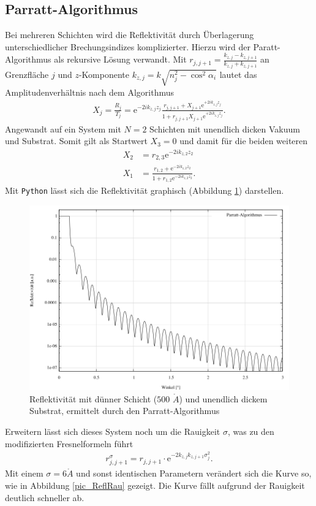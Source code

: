 \subsection{Parratt-Algorithmus}
Bei mehreren Schichten wird die Reflektivität durch Überlagerung unterschiedlicher Brechungsindizes komplizierter. Hierzu wird der Paratt-Algorithmus als
rekursive Lösung verwandt. Mit $r_{j,j+1} = \frac{k_{z,j}-k_{z,j+1}}{k_{z,j}+k_{z,j+1}}$ an Grenzfläche $j$ und $z$-Komponente $k_{z,j} = k\sqrt{n_j^2-\cos^2\alpha_i}$
lautet das Amplitudenverhältnis nach dem Algorithmus
\begin{align}
 X_j = \frac{R_j}{T_j} = \text{e}^{-2ik_{z,j}z_j}\frac{r_{j,j+1} + X_{j+1} \text{e}^{+2ik_{z,j}z_j}}{1 + r_{j,j+1} X_{j+1}\text{e}^{+2ik_{z,j}z_j}}.
\end{align}
Angewandt auf ein System mit $N=2$ Schichten mit unendlich dicken Vakuum und Substrat. Somit gilt als Startwert $X_3 = 0$ und damit für die beiden weiteren
\begin{align}
 X_2 &= r_{2,3}\text{e}^{-2ik_{z,2}z_2}\\
 X_1 &= \frac{r_{1,2}+\text{e}^{-2ik_{z,2}z_2}}{1+r_{1,2}\text{e}^{-2ik_{z,2}z_2}}.
\end{align}
Mit \texttt{Python} lässt sich die Reflektivität graphisch (Abbildung \ref{pic_ReflNormal}) darstellen.

\begin{figure}[H]
 \includegraphics[width=\textwidth]{../pics/normal.jpg}
 \caption{Reflektivität mit dünner Schicht ($500$ $\mathring{A}$) und unendlich dickem Substrat, ermittelt durch den Parratt-Algorithmus}
 \label{pic_ReflNormal}
\end{figure}
\noindent
Erweitern lässt sich dieses System noch um die Rauigkeit $\sigma$, was zu den modifizierten Fresnelformeln führt
\begin{align}
 r^\sigma_{j,j+1} = r_{j,j+1} \cdot \text{e}^{-2k_{z,j}k_{z,j+1}\sigma_j^2}.
\end{align}
Mit einem $\sigma = 6\mathring{A}$ und sonst identischen Parametern verändert sich die Kurve so, wie in Abbildung \ref{pic_ReflRau} gezeigt. Die Kurve fällt aufgrund
der Rauigkeit deutlich schneller ab.


